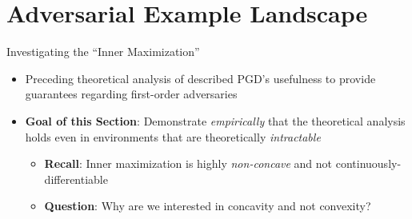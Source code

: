 \section{Adversarial Example Landscape}

\begin{frame}{Investigating the ``Inner Maximization''}

  \begin{itemize}[<+->]
    \setlength{\itemsep}{20pt}
    \item Preceding theoretical analysis of \textbf{} described PGD's usefulness to provide guarantees regarding first-order adversaries
    \item \textbf{Goal of this Section}: Demonstrate \textit{empirically} that the theoretical analysis holds even in environments that are theoretically \textit{intractable}
      \begin{itemize}[<+->]
        \setlength{\itemsep}{8pt}
        \item \textbf{Recall}: Inner maximization is highly \textit{non-concave} and not continuously-differentiable
        \item \textbf{Question}: Why are we interested in concavity and not convexity?
      \end{itemize}
  \end{itemize}
\end{frame}


